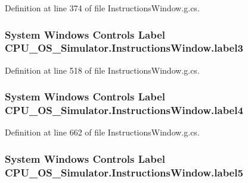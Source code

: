 Definition at line 374 of file Instructions\+Window.\+g.\+cs.

\hypertarget{class_c_p_u___o_s___simulator_1_1_instructions_window_a394b28c312ae1a83128da41990fc5d32}{}
\subsubsection[{label3}]{\setlength{\rightskip}{0pt plus 5cm}System Windows Controls Label C\+P\+U\+\_\+\+O\+S\+\_\+\+Simulator.\+Instructions\+Window.\+label3\hspace{0.3cm}{\ttfamily [package]}}\label{class_c_p_u___o_s___simulator_1_1_instructions_window_a394b28c312ae1a83128da41990fc5d32}


Definition at line 518 of file Instructions\+Window.\+g.\+cs.

\hypertarget{class_c_p_u___o_s___simulator_1_1_instructions_window_a6d028c99fa713c891d86c07ef46f083b}{}
\subsubsection[{label4}]{\setlength{\rightskip}{0pt plus 5cm}System Windows Controls Label C\+P\+U\+\_\+\+O\+S\+\_\+\+Simulator.\+Instructions\+Window.\+label4\hspace{0.3cm}{\ttfamily [package]}}\label{class_c_p_u___o_s___simulator_1_1_instructions_window_a6d028c99fa713c891d86c07ef46f083b}


Definition at line 662 of file Instructions\+Window.\+g.\+cs.

\hypertarget{class_c_p_u___o_s___simulator_1_1_instructions_window_acfbda3e1b251a166abc72a07d4cb5025}{}
\subsubsection[{label5}]{\setlength{\rightskip}{0pt plus 5cm}System Windows Controls Label C\+P\+U\+\_\+\+O\+S\+\_\+\+Simulator.\+Instructions\+Window.\+label5\hspace{0.3cm}{\ttfamily [package]}}\label{class_c_p_u___o_s___simulator_1_1_instructions_window_acfbda3e1b251a166abc72a07d4cb5025}


